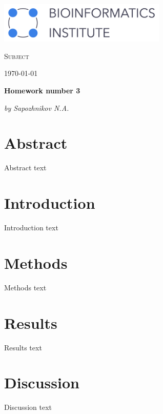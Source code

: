 \documentclass{scrartcl}
\begin{document}
\begin{titlepage}
	\centering
	\includegraphics[width=0.6\textwidth]{Graphics/BI_logo.png}\par
	\vspace{5cm}

	{\scshape\huge Subject \par} 
	\vspace{1cm}
	{\Large \today\par}
	\vfill
	
	{\huge\bfseries Homework number 3\par}
	\vfill
	
	{\Large\itshape by Sapozhnikov N.A.}\par
	\vspace{1.5cm}

	\vfill


	\vfill
\end{titlepage}

\newpage
\section{Abstract}
Abstract text

\section{Introduction}
Introduction text

\section{Methods}
Methods text

\section{Results}
Results text

\section{Discussion}
Discussion text
\end{document}
